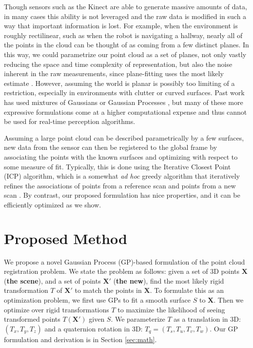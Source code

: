 \documentclass{article} %
\begin{document}
Though sensors such as the Kinect are able to generate massive amounts of data, in many cases this ability is not leveraged and the raw data is modified in such a way that important information is lost. For example, when the environment is roughly rectilinear, such as when the robot is navigating a hallway, nearly all of the points in the cloud can be thought of as coming from a few distinct planes. In this way, we could parametrize our point cloud as a set of planes, not only vastly reducing the space and time complexity of representation, but also the noise inherent in the raw measurements, since plane-fitting uses the most likely estimate \cite{martin_real-time_2002}\cite{liu_using_2001}\cite{thrun_real-time_2004}. However, assuming the world is planar is possibly too limiting of a restriction, especially in environments with clutter or curved surfaces. Past work has used mixtures of Gaussians \cite{tsin2004correlation} \cite{jian2005robust} or Gaussian Processes \cite{plagemann2008nonstationary}, but many of these more expressive formulations come at a higher computational expense and thus cannot be used for real-time perception algorithms.

Assuming a large point cloud can be described parametrically by a few surfaces, new data from the sensor can then be registered to the global frame by associating the points with the known surfaces and optimizing with respect to some measure of fit. Typically, this is done using the Iterative Closest Point (ICP) algorithm, which is a somewhat \emph{ad hoc} greedy algorithm that iteratively refines the associations of points from a reference scan and points from a new scan \cite{besl_method_1992}. By contrast, our proposed formulation has nice properties, and it can be efficiently optimized as we show.


\section{Proposed Method}

We propose a novel Gaussian Process (GP)-based formulation of the point cloud registration problem.
We state the problem as follows: given a set of 3D points $\mathbf{X}$ ({\bf the scene}), and a set of points $\mathbf{X'}$ ({\bf the new}), find the most likely rigid transformation $T$ of $\mathbf{X'}$ to match the points in $\mathbf{X}$. 
To formulate this as an optimization problem, we first use GPs to fit a smooth surface $S$ to $\mathbf{X}$. Then we optimize over
rigid transformations $T$ to maximize the likelihood of seeing transformed points $T(\mathbf{X'})$ given $S$. We parameterize $T$ as a translation in 3D: $(T_x, T_y, T_z)$ and a quaternion rotation in 3D: $T_q = (T_s, T_u, T_v, T_w)$. Our GP formulation and derivation is in Section \ref{sec:math}.
\end{document}
